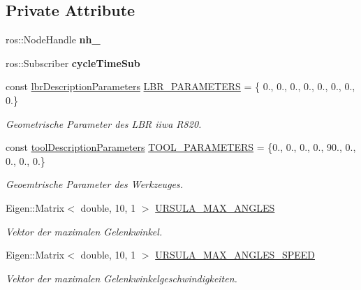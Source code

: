 \subsection*{Private Attribute}
\begin{DoxyCompactItemize}
\item 
\hypertarget{classNumericKinematic_aa34a71fe4f46fe30dd97fc729bf9d41f}{ros\-::\-Node\-Handle {\bfseries nh\-\_\-}}\label{classNumericKinematic_aa34a71fe4f46fe30dd97fc729bf9d41f}

\item 
\hypertarget{classNumericKinematic_ad53a5e081b607e929b5dcd79ba597dfa}{ros\-::\-Subscriber {\bfseries cycle\-Time\-Sub}}\label{classNumericKinematic_ad53a5e081b607e929b5dcd79ba597dfa}

\item 
const \hyperlink{structlbrDescriptionParameters}{lbr\-Description\-Parameters} \hyperlink{classNumericKinematic_a1dc6a0780af1ef87cd5f6e8c95f1f7a7}{L\-B\-R\-\_\-\-P\-A\-R\-A\-M\-E\-T\-E\-R\-S} = \{ 0., 0., 0., 0., 0., 0., 0., 0.\}
\begin{DoxyCompactList}\small\item\em Geometrische Parameter des L\-B\-R iiwa R820. \end{DoxyCompactList}\item 
const \hyperlink{structtoolDescriptionParameters}{tool\-Description\-Parameters} \hyperlink{classNumericKinematic_ae23ea272ef83d6d3285730fe33fa250b}{T\-O\-O\-L\-\_\-\-P\-A\-R\-A\-M\-E\-T\-E\-R\-S} = \{0., 0., 0., 0., 90., 0., 0., 0., 0.\}
\begin{DoxyCompactList}\small\item\em Geoemtrische Parameter des Werkzeuges. \end{DoxyCompactList}\item 
Eigen\-::\-Matrix$<$ double, 10, 1 $>$ \hyperlink{classNumericKinematic_a562cfd1d8c6b0f0074fb2796e8fbff13}{U\-R\-S\-U\-L\-A\-\_\-\-M\-A\-X\-\_\-\-A\-N\-G\-L\-E\-S}
\begin{DoxyCompactList}\small\item\em Vektor der maximalen Gelenkwinkel. \end{DoxyCompactList}\item 
Eigen\-::\-Matrix$<$ double, 10, 1 $>$ \hyperlink{classNumericKinematic_af6d15e97e215a9d8e552f1667bb6234f}{U\-R\-S\-U\-L\-A\-\_\-\-M\-A\-X\-\_\-\-A\-N\-G\-L\-E\-S\-\_\-\-S\-P\-E\-E\-D}
\begin{DoxyCompactList}\small\item\em Vektor der maximalen Gelenkwinkelgeschwindigkeiten. \end{DoxyCompactList}\item 

\end{DoxyCompactItemize}
